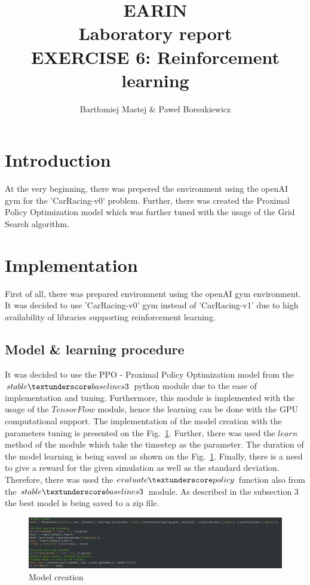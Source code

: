\documentclass[runningheads]{llncs}
\begin{document}
%
\title{EARIN\\Laboratory report\\EXERCISE 6: Reinforcement learning}
%
\author{Bartłomiej Mastej \& Paweł Borsukiewicz}
%

%
\maketitle              %
%
%
%
%
\section{Introduction}
At the very beginning, there was prepered the environment using the openAI gym for the 'CarRacing-v0' problem. Further, there was created the Proximal Policy Optimization model which was further tuned with the usage of the Grid Search algorithm.
\section{Implementation}
First of all, there was prepared environment using the openAI gym environment. It was decided to use 'CarRacing-v0' gym instead of 'CarRacing-v1' due to high availability of libraries supporting reinforcement learning.
\subsection{Model \& learning procedure}
It was decided to use the PPO - Proximal Policy Optimization model from the $stable\textunderscore baselines3$ python module due to the ease of implementation and tuning. Furthermore, this module is implemented with the usage of the $TensorFlow$ module, hence the learning can be done with the GPU computational support. The implementation of the model creation with the parameters tuning is presented on the Fig.~\ref{fig4}. Further, there was used the $learn$ method of the module which take the timestep as the parameter. The duration of the model learning is being saved as shown on the Fig.~\ref{fig4}. Finally, there is a need to give a reward for the given simulation as well as the standard deviation. Therefore, there was used the $evaluate\textunderscore policy$ function also from the $stable\textunderscore baselines3$ module. As described in the subsection 3 the best model is being saved to a zip file.
\begin{figure}
  \centering
  \includegraphics[width=\textwidth]{Screenshots/learn.png}
\caption{Model creation} \label{fig4}
\end{figure}
\end{document}
